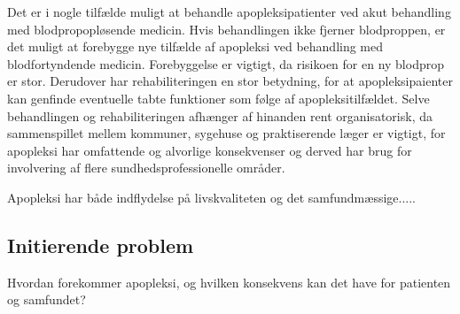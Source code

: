 Det er i nogle tilfælde muligt at behandle apopleksipatienter ved akut behandling med blodpropopløsende medicin. Hvis behandlingen ikke fjerner blodproppen, er det muligt at forebygge nye tilfælde af apopleksi ved behandling med blodfortyndende medicin. Forebyggelse er vigtigt, da risikoen for en ny blodprop er stor. Derudover har rehabiliteringen en stor betydning, for at apopleksipaienter kan genfinde eventuelle tabte funktioner som følge af apopleksitilfældet. Selve behandlingen og rehabiliteringen afhænger af hinanden rent organisatorisk, da sammenspillet mellem kommuner, sygehuse og praktiserende læger er vigtigt, for apopleksi har omfattende og alvorlige konsekvenser og derved har brug for involvering af flere sundhedsprofessionelle områder.

Apopleksi har både indflydelse på livskvaliteten og det samfundmæssige.....




\subsection{Initierende problem}
Hvordan forekommer apopleksi, og hvilken konsekvens kan det have for patienten og samfundet?